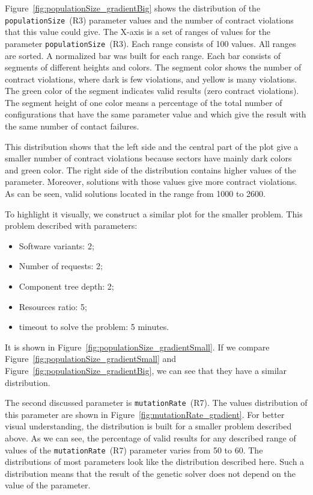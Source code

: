 Figure~\ref{fig:populationSize_gradientBig} shows the distribution of the \texttt{populationSize}~(R3) parameter values and the number of contract violations that this value could give. The X-axis is a set of ranges of values for the parameter \texttt{populationSize}~(R3). Each range consists of 100 values. All ranges are sorted. A normalized bar was built for each range. Each bar consists of segments of different heights and colors. The segment color shows the number of contract violations, where dark is few violations, and yellow is many violations. The green color of the segment indicates valid results (zero contract violations). The segment height of one color means a percentage of the total number of configurations that have the same parameter value and which give the result with the same number of contact failures.

This distribution shows that the left side and the central part of the plot give a smaller number of contract violations because sectors have mainly dark colors and green color. The right side of the distribution contains higher values of the parameter. Moreover, solutions with those values give more contract violations. As can be seen, valid solutions located in the range from 1000 to 2600.

To highlight it visually, we construct a similar plot for the smaller problem. This problem described with parameters:
\begin{itemize}
	\item Software variants: 2;
	\item Number of requests: 2;
	\item Component tree depth: 2;
	\item Resources ratio: 5;
	\item timeout to solve the problem: 5 minutes.
\end{itemize}

It is shown in Figure~\ref{fig:populationSize_gradientSmall}. If we compare Figure~\ref{fig:populationSize_gradientSmall} and Figure~\ref{fig:populationSize_gradientBig}, we can see that they have a similar distribution.

The second  discussed parameter is \texttt{mutationRate}~(R7). The values distribution of this parameter are shown in Figure~\ref{fig:mutationRate_gradient}. For better visual understanding, the distribution is built for a smaller problem described above. 
As we can see, the percentage of valid results for any described range of values of the \texttt{mutationRate}~(R7) parameter varies from 50 to 60. The distributions of most parameters look like the distribution described here. Such a distribution means that the result of the genetic solver does not depend on the value of the parameter. 

